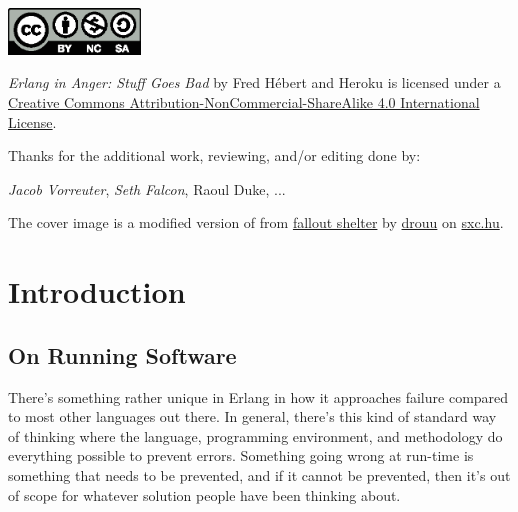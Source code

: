 \documentclass[11pt, oneside]{book}   	%
\begin{document}



\clearpage
\thispagestyle{empty}
\vspace*{\fill}



\begin{center}
\includegraphics[width=100pt]{by-nc-sa.eps}
\end{center}

\begin{center}
\emph{Erlang in Anger: Stuff Goes Bad} by Fred Hébert and Heroku is licensed under a \href{http://creativecommons.org/licenses/by-nc-sa/4.0/}{Creative Commons Attribution-NonCommercial-ShareAlike 4.0 International License}.
\end{center}

Thanks for the additional work, reviewing, and/or editing done by:

\emph{Jacob Vorreuter}, \emph{Seth Falcon}, Raoul Duke, ...

\null
\vfill

The cover image is a modified version of from \href{http://www.freeimages.com/photo/533163}{fallout shelter} by \href{http://www.freeimages.com/profile/drouu}{drouu} on \href{http://sxc.hu}{sxc.hu}.

\clearpage


\tableofcontents

\listoffigures

\hypersetup{linkcolor=violet}


\chapter{Introduction}
\label{chap:introduction}

\section{On Running Software}
\label{sec:on-running-software}

There's something rather unique in Erlang in how it approaches failure compared to most other languages out there. In general, there's this kind of standard way of thinking where the language, programming environment, and methodology do everything possible to prevent errors. Something going wrong at run-time is something that needs to be prevented, and if it cannot be prevented, then it's out of scope for whatever solution people have been thinking about.
\end{document}
